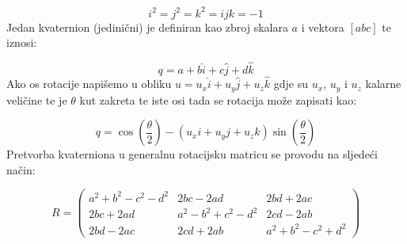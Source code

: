 \begin{equation}
  i^2 = j^2 = k^2 = ijk = -1
  \label{eq:quat_multiply}
\end{equation}
Jedan kvaternion (jedinični) je definiran kao zbroj skalara $a$ i vektora $[a b c]$ te iznosi:

\begin{equation}
  q = a + b\hat{i} + c\hat{j} + d\hat{k}
  \label{eq:jedinicni_vektor}
\end{equation}
Ako os rotacije napišemo u obliku $u=u_{x}\hat{i} + u_{y}\hat{j} + u_{z}\hat{k}$ gdje su $u_{x}$, $u_{y}$ i $u_{z}$ kalarne veličine te je $\theta$ kut zakreta te iste osi tada se rotacija može zapisati kao:

\begin{equation}
  q=\cos(\frac{\theta}{2})-(u_{x}i + u_{y}j + u_{z}k)\sin(\frac{\theta}{2})
\end{equation}
Pretvorba kvaterniona u generalnu rotacijsku matricu se provodu na sljedeći način:

\begin{equation}
R = 
  \begin{pmatrix}
    a^2 + b^2 - c^2 - d^2 & 2bc - 2ad & 2bd + 2ac \\
    2bc + 2ad & a^2 - b^2 + c^2 - d^2 & 2cd - 2ab \\
    2bd - 2ac & 2cd + 2ab & a^2 + b^2 - c^2 + d^2
  \end{pmatrix}
  \label{eq:qvat_to_rot_mat}
\end{equation}